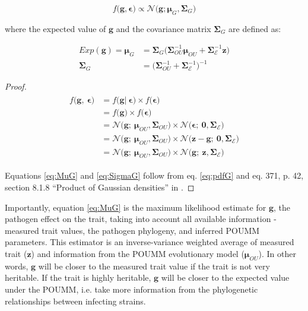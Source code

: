 \documentclass[11pt]{article}
\begin{document}
\begin{linenumbers}
\begin{equation}
	f\big(\bm{g}, \bm{\epsilon}\big) \propto \mathcal{N}\big(\bm{g}; \bm{\mu}_{G}, \boldsymbol{\Sigma}_G\big)
	\label{eq:pdfGprop}
\end{equation} 

where the expected value of $\bm{g}$ and the covariance matrix $\boldsymbol{\Sigma}_G$ are defined as:

\begin{align}
	Exp(\bm{g}) = \bm{\mu}_{G} &=  \boldsymbol{\Sigma}_G\big(\boldsymbol{\Sigma}_{OU}^{-1}\bm{\mu}_{OU} + \boldsymbol{\Sigma}_\mathcal{E}^{-1} \bm{z}\big) \label{eq:MuG}\\
	\boldsymbol{\Sigma}_G &= \big(\boldsymbol{\Sigma}_{OU}^{-1} + \boldsymbol{\Sigma}_\mathcal{E}^{-1}\big)^{-1} \label{eq:SigmaG}
\end{align}

\begin{proof}
	\begin{align}\label{eq:pdfG}
	\begin{split}
		f\big(\bm{g},\ \bm{\epsilon}\big) &= f\big(\bm{g}|\ \bm{\epsilon}\big) \times f\big(\bm{\epsilon}\big) \\
	&= f\big(\bm{g}\big) \times f\big(\bm{\epsilon}\big) \\
	&= \mathcal{N}\big(\bm{g};\ \bm{\mu}_{OU}, \mathbf{\Sigma}_{OU}\big) \times \mathcal{N}\big(\bm{\epsilon};\ \bm{0}, \mathbf{\Sigma}_\mathcal{E}\big) \\
	&= \mathcal{N}\big(\bm{g};\ \bm{\mu}_{OU}, \mathbf{\Sigma}_{OU}\big) \times \mathcal{N}\big(\bm{z} - \bm{g};\ \bm{0}, \mathbf{\Sigma}_\mathcal{E}\big) \\
	&= \mathcal{N}\big(\bm{g};\ \bm{\mu}_{OU}, \mathbf{\Sigma}_{OU}\big) \times \mathcal{N}\big(\bm{g};\ \bm{z}, \mathbf{\Sigma}_\mathcal{E}\big)
	\end{split}
\end{align}
	
	Equations \ref{eq:MuG} and \ref{eq:SigmaG} follow from eq. \ref{eq:pdfG} and eq. 371, p. 42, section 8.1.8 ``Product of Gaussian densities'' in \citet{Petersen2012}.
\end{proof}

Importantly, equation \ref{eq:MuG} is the maximum likelihood estimate for $\bm{g}$, the pathogen effect on the trait, taking into account all available information - measured trait values, the pathogen phylogeny, and inferred POUMM parameters. This estimator is an inverse-variance weighted average of measured trait ($\bm{z}$) and information from the POUMM evolutionary model ($\bm{\mu}_{OU}$). In other words, $\bm{g}$ will be closer to the measured trait value if the trait is not very heritable. If the trait is highly heritable, $\bm{g}$ will be closer to the expected value under the POUMM, i.e. take more information from the phylogenetic relationships between infecting strains. 


\end{linenumbers}
\end{document}
